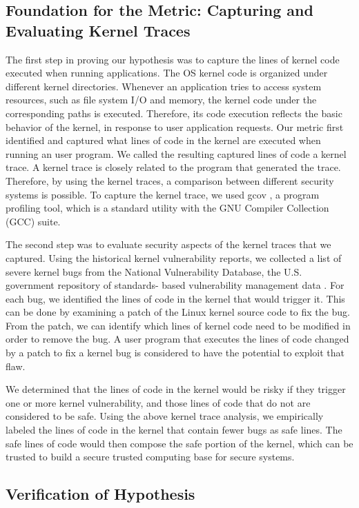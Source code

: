 \subsection{Foundation for the Metric: Capturing and Evaluating Kernel
Traces}

The first step in proving our hypothesis was to capture the lines of kernel
code executed 
when running applications. The OS kernel code is organized under different
kernel directories. 
Whenever an application tries to access system resources, such as file
system I/O and memory, 
the kernel code under the corresponding paths is executed. Therefore, 
its code execution reflects the basic behavior of the kernel, in response
to user application requests. 
Our metric first identified and captured what lines of code in the kernel
are executed 
when running an user program. We called the resulting captured lines of
code a kernel trace. 
A kernel trace is closely related to the program that generated the trace. 
Therefore, by using the kernel traces, a comparison between different
security systems is possible. 
To capture the kernel trace, we used gcov \cite{gcov}, a program profiling
tool, 
which  is a standard utility with the GNU Compiler Collection (GCC) suite. 

The second step was to evaluate security aspects of the kernel traces that
we captured. 
Using the historical kernel vulnerability reports, we collected a list of
severe kernel bugs from 
the National Vulnerability Database, the U.S. government repository of
standards- based 
vulnerability management data \cite{NVD}. For each bug, we identified the
lines of code 
in the kernel that would trigger it. This can be done by examining 
a patch of the Linux kernel source code to fix the bug. From the patch, 
we can identify which lines of kernel code need to be modified in order to
remove the bug. 
A user program that executes the lines of code changed by a patch to fix a
kernel bug 
is considered to have the potential to exploit that flaw.

We determined that the lines of code in the kernel would be risky 
if they trigger one or more kernel vulnerability, and those lines of code 
that do not are considered to be safe. Using the above kernel trace
analysis, 
we empirically labeled the lines of code in the kernel that contain fewer
bugs as safe lines. 
The safe lines of code would then compose the safe portion of the kernel, 
which can be trusted to build a secure trusted computing base for secure
systems.

\subsection{Verification of Hypothesis}

